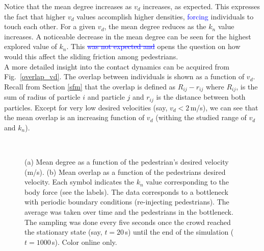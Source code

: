 \documentclass[preprint,12pt]{elsarticle}
\begin{document}
Notice that the mean degree increases as $v_d$ increases, as expected. This expresses the fact that
higher $v_d$ values accomplish higher densities, \textcolor{blue}{forcing} individuals to touch each 
other. For a given $v_d$, the mean degree reduces as the $k_n$ 
value increases. A noticeable decrease in the mean degree can be seen for the 
highest explored value of $k_n$. This \textcolor{blue}{\sout{was not expected and}} opens the question on how would
this affect the sliding friction among pedestrians.\\

A more detailed insight into the contact dynamics can be acquired from 
Fig.~\ref{overlap_vd}. The overlap between individuals is shown as a function of 
$v_d$. Recall from Section \ref{sfm} that the overlap is defined as 
$R_{ij}-r_{ij}$ where $R_{ij}$, is the sum of radius of particle $i$ and 
particle $j$ and $r_{ij}$  is the distance between both particles. Except for 
very low desired velocities (say, $v_d<2\,$m/s), we can see that the mean 
overlap is an increasing function of $v_d$ (withing the studied
range of $v_d$ and $k_n$).\\


\begin{figure}[!htbp]
\centering
    \ 
    \\
\caption[width=0.47\columnwidth]{(a) Mean degree as a function of the pedestrian’s desired velocity (m/s). (b) Mean overlap as a function of the pedestrians desired velocity. Each symbol indicates the $k_n$ value corresponding to the body force (see the labels). The data corresponds to a bottleneck with periodic boundary conditions (re-injecting pedestrians). The average was taken over time and the pedestrians in the bottleneck. The sampling was done every five seconds once the crowd reached the stationary state (say, $t=20\,$s) until the end of the simulation ($t=1000\,$s). Color online only.}
\label{degree_overlap_vd}
\end{figure}
\end{document}
